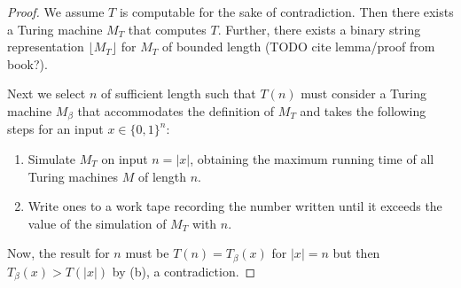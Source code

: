 \documentclass[usletter]{article}
\begin{document}
\begin{enumerate}
    \begin{proof}
      We assume $T$ is computable for the sake of contradiction. Then there exists a Turing machine $M_T$ that computes $T$. Further, there exists a binary string representation $\lfloor M_T \rfloor$ for $M_T$ of bounded length (TODO cite lemma/proof from book?).

      Next we select $n$ of sufficient length such that $T(n)$ must consider a Turing machine $M_{\beta}$ that accommodates the definition of $M_T$ and takes the following steps for an input $x \in \{0,1\}^n$:
      \begin{enumerate}
        \item Simulate $M_T$ on input $n = |x|$, obtaining the maximum running time of all Turing machines $M$ of length $n$.
        \item Write ones to a work tape recording the number written until it exceeds the value of the simulation of $M_T$ with $n$.
      \end{enumerate}

      Now, the result for $n$ must be $T(n) = T_{\beta}(x)$ for $|x| = n$ but then $T_{\beta}(x) > T(|x|)$ by (b), a contradiction.

    \end{proof}

\end{enumerate}
\end{document}

